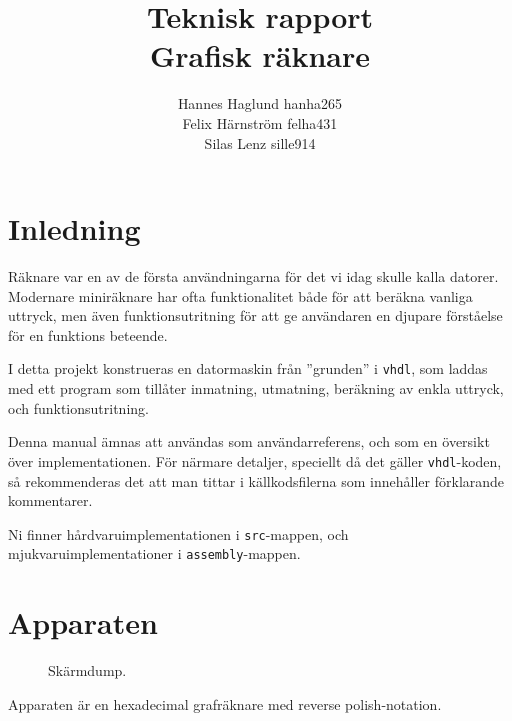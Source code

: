 \documentclass[]{article}
\title{Teknisk rapport\\Grafisk räknare}
\author{Hannes Haglund hanha265\\Felix Härnström felha431\\Silas Lenz sille914}
\begin{document}
\maketitle

\newpage

\section{Inledning}

Räknare var en av de första användningarna för det vi idag skulle kalla datorer. Modernare miniräknare har ofta funktionalitet både för att beräkna vanliga uttryck, men även funktionsutritning för att ge användaren en djupare förståelse för en funktions beteende.

I detta projekt konstrueras en datormaskin från ''grunden'' i \texttt{vhdl}, som laddas med ett program som tillåter inmatning, utmatning, beräkning av enkla uttryck, och funktionsutritning.

Denna manual ämnas att användas som användarreferens, och som en översikt över implementationen. För närmare detaljer, speciellt då det gäller \texttt{vhdl}-koden, så rekommenderas det att man tittar i källkodsfilerna som innehåller förklarande kommentarer.

Ni finner hårdvaruimplementationen i \texttt{src}-mappen, och mjukvaruimplementationer i \texttt{assembly}-mappen.

\section{Apparaten}
\begin{figure}[h!]
	\caption{Skärmdump.}
\end{figure}
Apparaten är en hexadecimal grafräknare med reverse polish-notation.
\end{document}

